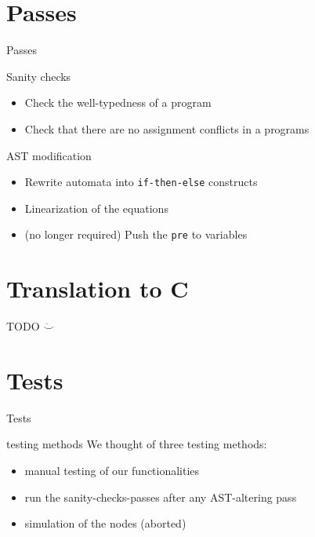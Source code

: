\documentclass{beamer}
\begin{document}
\section{Passes}
\begin{frame}{Passes}
	\begin{block}{Sanity checks}
		\begin{itemize}
			\item Check the well-typedness of a program
			\item Check that there are no assignment conflicts in a programs
		\end{itemize}
	\end{block}
	\begin{block}{AST modification}
		\begin{itemize}
			\item Rewrite automata into \texttt{if-then-else} constructs
			\item Linearization of the equations
			\item (no longer required) Push the \texttt{pre} to variables
		\end{itemize}
	\end{block}
\end{frame}

\section{Translation to C}
\begin{frame}
    \centerline{\Huge TODO $\boxed{\ddot\smile}$}
\end{frame}

\section{Tests}
\begin{frame}{Tests}
    \begin{block}{testing methods}
        We thought of three testing methods:
        \begin{itemize}
            \item manual testing of our functionalities
            \item run the sanity-checks-passes after any AST-altering pass
            \item simulation of the nodes (aborted)
        \end{itemize}
    \end{block}
\end{frame}
\end{document}
